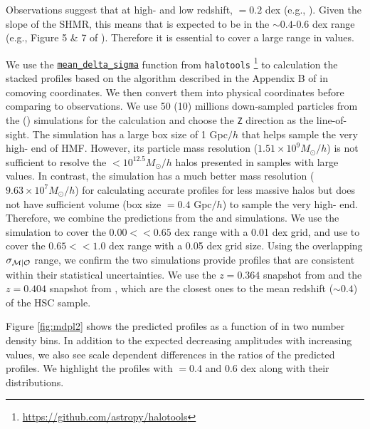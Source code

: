 \documentclass[fleqn,usenatbib,useAMS]{mnras}
\begin{document}
\begin{CJK*}{UTF8}{gbsn}
    Observations suggest that at high-\mhalo{} and low redshift, \scatterObsSymMhalo{}$=0.2$ dex
    (e.g., \citealt{More2011, Leauthaud2012, Reddick2013, Behroozi2013, Tinker2017}). 
    Given the slope of the SHMR, this means that \scatterMhaloObsSym{} is expected to be in the
    $\sim 0.4$-0.6 dex range (e.g., Figure 5 \& 7 of \citealt{Wechsler2018}). 
    Therefore it is essential to cover a large range in \scatterMhaloObsSym{} values.
    
    We use the
    \href{https://halotools.readthedocs.io/en/latest/api/halotools.mock_observables.mean_delta_sigma.html}{\texttt{mean\_delta\_sigma}}
    function from \texttt{halotools} \citep{Hearin2017}\footnote{
    \url{https://github.com/astropy/halotools}} to calculation the stacked \dsigma{} profiles based
    on the algorithm described in the Appendix B of \citet{Lange2019} in comoving coordinates.
    We then convert them into physical coordinates before comparing to observations.
    We use 50 (10) millions down-sampled particles from the  (\smdpl{}) simulations for the 
    calculation and choose the \texttt{Z} direction as the line-of-sight.
    The  simulation has a large box size of 1 Gpc$/h$ that helps sample the very
    high-\mhalo{} end of HMF.
    However, its particle mass resolution ($1.51 \times 10^{9} M_{\odot}/h$) is not sufficient to
    resolve the $< 10^{12.5} M_{\odot}/h$ halos presented in samples with large
    \scatterMhaloObsSym{} values.
    In contrast, the \smdpl{} simulation has a much better mass resolution ($9.63 \times 10^{7}
    M_{\odot}/h$) for calculating accurate \dsigma{} profiles for less massive halos but does not
    have sufficient volume (box size $=0.4$ Gpc$/h$) to sample the very  high-\mvir{} end.
    Therefore, we combine the predictions from the  and \smdpl{} simulations.
    We use the  simulation to cover the $0.00 <$\scatterMhaloObsSym{}$<0.65$ dex range
    with a 0.01 dex grid, and use \smdpl{} to cover the $0.65 <$\scatterMhaloObsSym{}$<1.0$ dex
    range with a 0.05 dex grid size.
    Using the overlapping $\sigma_{\mathcal{M} | \mathcal{O}}{}$ range, we confirm the two simulations provide
    \dsigma{} profiles that are consistent within their statistical uncertainties.
    We use the $z=0.364$ snapshot from  and the $z=0.404$ snapshot from \smdpl{}, which are
    the closest ones to the mean redshift ($\sim 0.4$) of the HSC sample. 
    
    Figure \ref{fig:mdpl2} shows the predicted \dsigma{} profiles as a function of 
    \scatterMhaloObsSym{} in two number density bins. 
    In addition to the expected decreasing \dsigma{} amplitudes with increasing
    \scatterMhaloObsSym{} values, we also see scale dependent differences in the ratios of the
    predicted \dsigma{} profiles.
    We highlight the \dsigma{} profiles with \scatterMhaloObsSym{}$=0.4$ and 0.6 dex along with
    their \mhalo{} distributions.
    

\end{CJK*}
\end{document}
